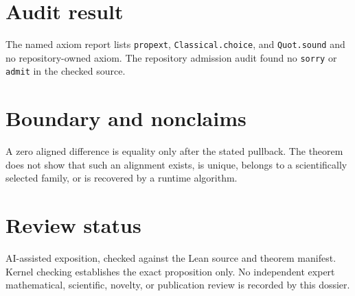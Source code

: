\documentclass[11pt]{article}
\begin{document}
\section{Audit result}
The named axiom report lists \texttt{propext}, \texttt{Classical.choice}, and
\texttt{Quot.sound} and no repository-owned axiom.  The repository admission audit found no
\texttt{sorry} or \texttt{admit} in the checked source.

\section{Boundary and nonclaims}
A zero aligned difference is equality only after the stated pullback.  The theorem does not show that such an alignment exists, is unique, belongs to a scientifically selected family, or is recovered by a runtime algorithm.

\section{Review status}
AI-assisted exposition, checked against the Lean source and theorem manifest.  Kernel checking
establishes the exact proposition only.  No independent expert mathematical, scientific,
novelty, or publication review is recorded by this dossier.
\end{document}
